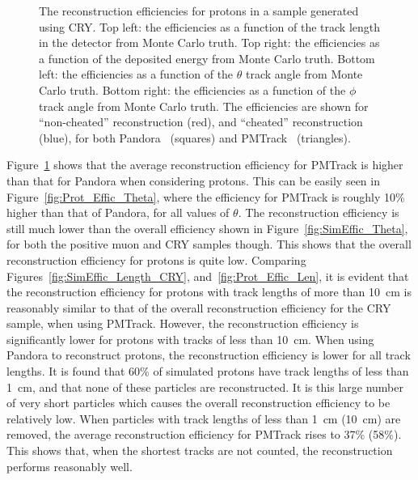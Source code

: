 \begin{figure}
  \caption[The reconstruction efficiencies for protons in a sample generated using CRY.]
          {The reconstruction efficiencies for protons in a sample generated using CRY. Top left: the efficiencies as a function of the track length in the detector from Monte Carlo truth. Top right: the efficiencies as a function of the deposited energy from Monte Carlo truth. Bottom left: the efficiencies as a function of the $\theta$ track angle from Monte Carlo truth. Bottom right: the efficiencies as a function of the $\phi$ track angle from Monte Carlo truth. The efficiencies are shown for ``non-cheated'' reconstruction (red), and ``cheated'' reconstruction (blue), for both Pandora~\citep{Pandora} (squares) and PMTrack~\citep{PMTrack} (triangles).}
  \label{fig:Prot_Effic}
\end{figure}

Figure~\ref{fig:Prot_Effic} shows that the average reconstruction efficiency for PMTrack is higher than that for Pandora when considering protons. This can be easily seen in Figure~\ref{fig:Prot_Effic_Theta}, where the efficiency for PMTrack is roughly 10\% higher than that of Pandora, for all values of $\theta$. The reconstruction efficiency is still much lower than the overall efficiency shown in Figure~\ref{fig:SimEffic_Theta}, for both the positive muon and CRY samples though. This shows that the overall reconstruction efficiency for protons is quite low. Comparing Figures~\ref{fig:SimEffic_Length_CRY}, and~\ref{fig:Prot_Effic_Len}, it is evident that the reconstruction efficiency for protons with track lengths of more than 10~cm is reasonably similar to that of the overall reconstruction efficiency for the CRY sample, when using PMTrack. However, the reconstruction efficiency is significantly lower for protons with tracks of less than 10~cm. When using Pandora to reconstruct protons, the reconstruction efficiency is lower for all track lengths. It is found that 60\% of simulated protons have track lengths of less than 1~cm, and that none of these particles are reconstructed. It is this large number of very short particles which causes the overall reconstruction efficiency to be relatively low. When particles with track lengths of less than 1~cm (10~cm) are removed, the average reconstruction efficiency for PMTrack rises to 37\% (58\%). This shows that, when the shortest tracks are not counted, the reconstruction performs reasonably well. \\

